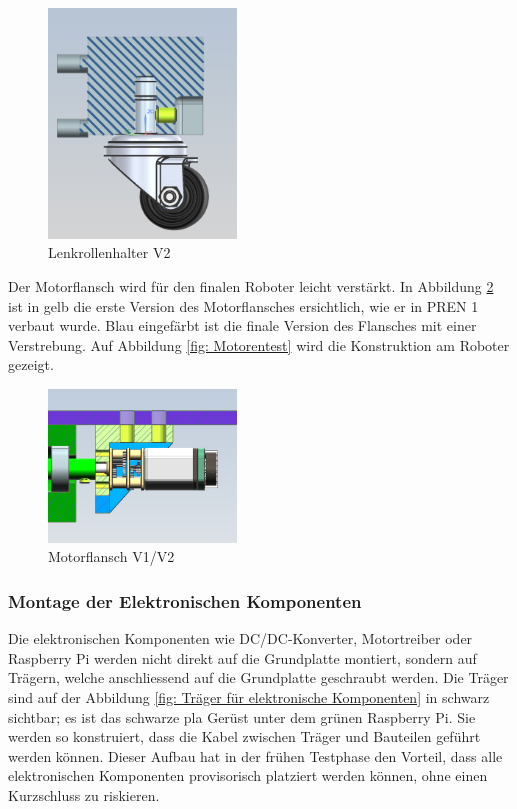 \begin{figure}[H]
\centering
\includegraphics[width=5cm]{assets/MT/Lenkrollenhalter V2.png}
\caption{Lenkrollenhalter V2}
\label{fig: Lenkrollenhalter V2}
\end{figure}

Der Motorflansch wird für den finalen Roboter leicht verstärkt. In Abbildung \ref{fig: Motorflansch V1/V2} ist in gelb die erste Version des Motorflansches ersichtlich, wie er in PREN 1 verbaut wurde. Blau eingefärbt ist die finale Version des Flansches mit einer Verstrebung. Auf Abbildung \ref{fig: Motorentest} wird die Konstruktion am Roboter gezeigt.

\begin{figure}[H]
\centering
\includegraphics[width=5cm]{assets/MT/Motorflansch Vergleich.png}
\caption{Motorflansch V1/V2}
\label{fig: Motorflansch V1/V2}
\end{figure}

\subsubsection{Montage der Elektronischen Komponenten}
\label{Montage der Elektronischen Komponenten}


Die elektronischen Komponenten wie DC/DC-Konverter, Motortreiber oder Raspberry Pi werden nicht direkt auf die Grundplatte montiert, sondern auf Trägern, welche anschliessend auf die Grundplatte geschraubt werden. Die Träger sind auf der Abbildung \ref{fig: Träger für elektronische Komponenten} in schwarz sichtbar; es ist das schwarze \acrfull{pla} Gerüst unter dem grünen Raspberry Pi. Sie werden so konstruiert, dass die Kabel zwischen Träger und Bauteilen geführt werden können. 
Dieser Aufbau hat in der frühen Testphase den Vorteil, dass alle elektronischen Komponenten provisorisch platziert werden können, ohne einen Kurzschluss zu riskieren. 

